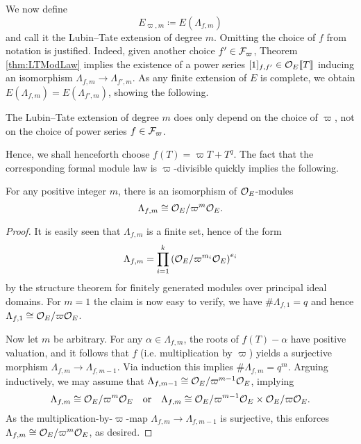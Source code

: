 \documentclass[../main.tex]{subfiles}
\begin{document}
We now define 
\begin{equation*}
  E_{\varpi, m} \coloneq E(\Lambda_{f, m})
\end{equation*}
and call it the Lubin--Tate extension of degree $m$. 
Omitting the choice of $f$ from notation is justified. Indeed, given 
another choice $f' \in \mathcal{F}_\varpi$, Theorem \ref{thm:LTModLaw} implies the 
existence of a power series $[1]_{f,f'} \in \mathcal{O}_E\llbracket T \rrbracket$ inducing an
isomorphism $\Lambda_{f,m} \to \Lambda_{f',m}$. As any finite extension of $E$
is complete, we obtain $E(\Lambda_{f,m}) = E(\Lambda_{f',m})$, showing the following.
\begin{lem}\label{lem:FiniteLTExtensionIndepOfF}
  The Lubin--Tate extension of degree $m$ does only depend on the choice of $\varpi$,
  not on the choice of power series $f \in \mathcal{F}_\varpi$. 
\end{lem}

Hence, we shall henceforth choose $f(T) = \varpi T + T^q$. 
The fact that the corresponding formal module law is $\varpi$-divisible quickly 
implies the following.
\begin{lem}\label{lem:StructureOfLambdamf}
  For any positive integer $m$, there is an isomorphism of $\mathcal{O}_E$-modules
  \begin{equation*}
    \Lambda_{f,m} \cong \mathcal{O}_E/\varpi^m\mathcal{O}_E.
  \end{equation*}
\begin{proof}
  It is easily seen that $\Lambda_{f,m}$ is a finite set, hence of the form
  \begin{equation*}
    \Lambda_{f,m} = \prod_{i = 1}^k \left(\mathcal{O}_E/\varpi^{m_i} \mathcal{O}_E \right)^{e_i}
  \end{equation*}
  by the structure theorem for finitely generated modules over principal ideal domains.
  For $m=1$ the claim is now easy to verify, we have $\# \Lambda_{f,1} = q$ and 
  hence $\Lambda_{f,1} \cong \mathcal{O}_E/\varpi\mathcal{O}_E$.

  Now let $m$ be arbitrary. For any $\alpha \in \Lambda_{f,m}$, the roots of
  $f(T) - \alpha$ have positive valuation, and it follows that $f$ (i.e. multiplication
  by $\varpi$) yields a
  surjective morphism $\Lambda_{f,m} \to \Lambda_{f,m-1}$. Via induction this
  implies $\# \Lambda_{f,m} = q^m$.
  Arguing inductively, we may assume that 
  $\Lambda_{f,m-1} \cong \mathcal{O}_E/\varpi^{m-1}\mathcal{O}_E$,  implying
  \begin{equation*}
    \Lambda_{f,m} \cong \mathcal{O}_E/\varpi^{m}\mathcal{O}_E \quad \text{or} \quad 
    \Lambda_{f,m} \cong \mathcal{O}_E/\varpi^{m-1}\mathcal{O}_E \times \mathcal{O}_E/\varpi \mathcal{O}_E.
  \end{equation*}
  As the multiplication-by-$\varpi$-map $\Lambda_{f,m} \to \Lambda_{f,m-1}$ is
  surjective, this enforces $\Lambda_{f,m} \cong \mathcal{O}_E/\varpi^m\mathcal{O}_E$, as desired.
\end{proof}
\end{lem}
\end{document}
